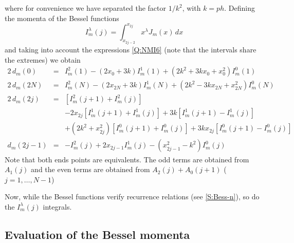 %
where for convenience we have separated the factor $1/k^{2}$, with $k =
ph$. Defining the momenta of the Bessel functions
\begin{equation}\label{Q:NMI7}
I_{m}^{\lambda}(j) = \int_{x_{2j-2}}^{x_{2j}} x^{\lambda} J_{m}(x) \,
d x
\end{equation}
and taking into account the expressions \ref{Q:NMI6} (note that the
intervals share the extremes) we obtain
\begin{eqnarray*}
  2 \, d_{m}(0) &=& I^{2}_{m}(1) - (2 x_{0}+3 k) I^{1}_{m}(1) + (2 k^{2}  + 3 k x_{0} + x_{0}^{2}) I_{m}^{0}(1) \nonumber
  \\
  2 \, d_{m}(2 N) &=& I^{2}_{m}(N) - (2 x_{2N}+3 k) I^{1}_{m}(N) + (2  k^{2} - 3 k x_{2 N} + x_{2 N}^{2}) I_{m}^{0}(N) \quad \nonumber
  \\
  2 \, d_{m}(2 j) &=& \left[ I^{2}_{m}(j+1) + I^{2}_{m}(j) \right]
  \\
  && - 2 x_{2j}\left[ I^{1}_{m}(j+1) + I^{1}_{m}(j)\right] + 3k \left[ I^{1}_{m}(j+1) - I^{1}_{m}(j) \right] \nonumber
  \\
  &&+ (2k^{2} + x_{2j}^{2}) \left[ I^{0}_{m}(j+1) + I^{0}_{m}(j)\right] + 3k x_{2j}\left[ I^{0}_{m}(j+1) - I^{0}_{m}(j) \right] \nonumber
  \\
  d_{m}(2 j-1) &=& -I^{2}_{m}(j) + 2 x_{2j-1} I^{1}_{m}(j) - (x_{2j-1}^{2} - k^{2}) I^{0}_{m}(j) \nonumber
\end{eqnarray*}
Note that both ends points are equivalents. The odd terms are obtained from $A_{1}(j)$ and the even terms are obtained from $A_{2}(j)+A_{0}(j+1)$ ($j=1, \ldots, N-1$)

Now, while the Bessel functions verify recurrence relations (see \ref{S:Bess-n}), so do the $I_{m}^{\lambda}(j)$ integrals.

\subsection{Evaluation of the Bessel momenta}


